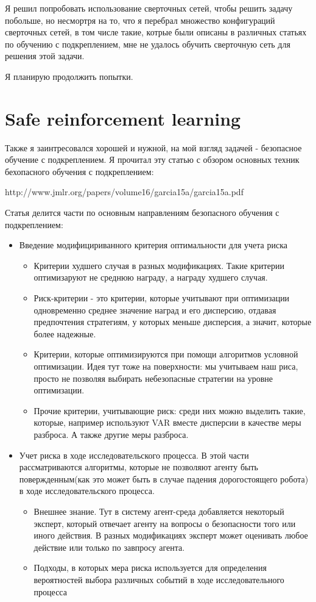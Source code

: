 \documentclass[a4paper]{article}
\begin{document}
Я решил попробовать использование сверточных сетей, чтобы решить задачу побольше, но несмортря на то, что я перебрал множество конфигураций сверточных сетей, в том числе такие, котрые были описаны в различных статьях по обучению с подкреплением, мне не удалось обучить сверточную сеть для решения этой задачи.

Я планирую продолжить попытки.
\section{Safe reinforcement learning}

Также я заинтресовался хорошей и нужной, на мой взгляд задачей - безопасное обучение с подкреплением.
Я прочитал эту статью с обзором основных техник бехопасного обучения с подкреплением:

http://www.jmlr.org/papers/volume16/garcia15a/garcia15a.pdf


Статья делится части по основным направлениям безопасного обучения с подкреплением:
\begin{itemize}
\item Введение модифицириванного критерия оптимальности для учета риска
\begin{itemize}
\item Критерии худшего случая в разных модификациях. Такие критерии оптимизаруют не среднюю награду, а награду худшего случая.
\item  Риск-критерии - это критерии, которые учитывают при оптимизации одновременно среднее значение наград и его дисперсию, отдавая предпочтения стратегиям, у которых меньше дисперсия, а значит, которые более надежные.
\item Критерии, которые оптимизируются при помощи алгоритмов условной оптимизации. Идея тут тоже на поверхности: мы учитываем наш риса, просто не позволяя выбирать небезопасные стратегии на уровне оптимизации.
\item Прочие критерии, учитывающие риск: среди них можно выделить такие, которые, например используют VAR вместе дисперсии в качестве меры разброса. А также другие меры разброса.
\end{itemize}
\item Учет риска в ходе исследовательского процесса. В этой части рассматриваются алгоритмы, которые не позволяют агенту быть повержденным(как это может быть в случае падения дорогостоящего робота) в ходе исследовательского процесса.
\begin{itemize}
\item Внешнее знание. Тут в систему агент-среда добавляется некоторый эксперт, который отвечает агенту на вопросы о безопасности того или иного действия. В разных модификациях эксперт может оценивать любое действие или только по завпросу агента.
\item Подходы, в которых мера риска используется для определения вероятностей выбора различных событий в ходе исследовательного процесса

\end{itemize} 
\end{itemize}
\end{document}
